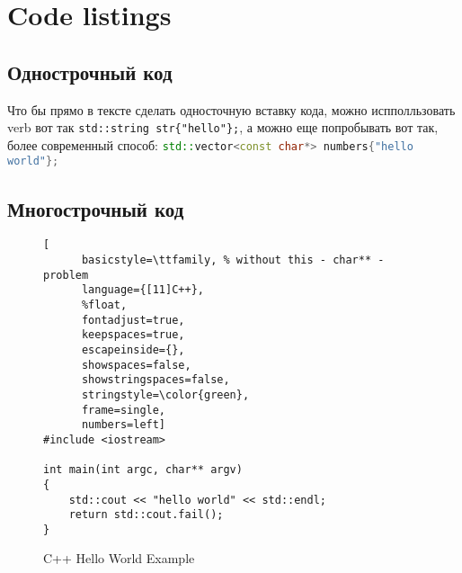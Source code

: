 \documentclass[a4paper,14pt]{book}
\begin{document}
\section{Code listings}
\subsection{Однострочный код}
Что бы прямо в тексте сделать односточную вставку кода, можно испполльзовать verb вот так \verb|std::string str{"hello"};|, а
можно еще попробывать вот так, более современный способ:
\lstinline[language=C++,basicstyle=\ttfamily,]!std::vector<const char*> numbers{"hello world"};!

\subsection{Многострочный код}

\begin{figure}
	\begin{lstlisting}[
	  basicstyle=\ttfamily, % without this - char** - problem
	  language={[11]C++},
	  %float,
	  fontadjust=true,
	  keepspaces=true,
	  escapeinside={},
	  showspaces=false,
	  showstringspaces=false,
	  stringstyle=\color{green},
	  frame=single,
	  numbers=left]
#include <iostream>

int main(int argc, char** argv)
{
    std::cout << "hello world" << std::endl;
    return std::cout.fail();
}   \end{lstlisting}
	\caption{C++ Hello World Example}
	\label{lst:hello}
\end{figure}


\setcounter{tocdepth}{3}
\tableofcontents
\end{document}
